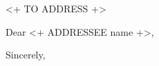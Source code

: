 \documentclass{letter}
\begin{document}
\begin{letter}{<+ TO ADDRESS +>}

\opening{Dear <+ ADDRESSEE name +>,}

\vspace{2\parskip}
\closing{Sincerely,}

\end{letter}
\end{document}
